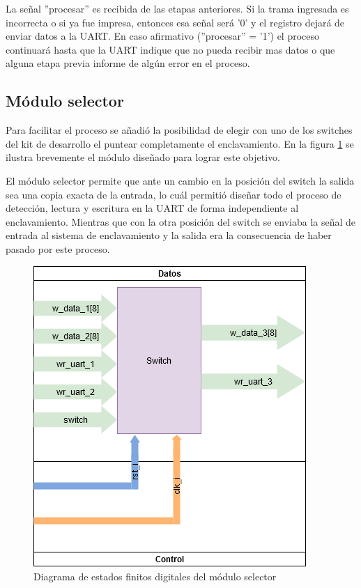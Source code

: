 		La señal ''procesar'' es recibida de las etapas anteriores. Si la trama ingresada es incorrecta o si ya fue impresa, entonces esa señal será '0' y el registro dejará de enviar datos a la UART. En caso afirmativo (''procesar'' = '1') el proceso continuará hasta que la UART indique que no pueda recibir mas datos o que alguna etapa previa informe de algún error en el proceso.
		
	\subsection{Módulo selector}
	
		Para facilitar el proceso se añadió la posibilidad de elegir con uno de los switches del kit de desarrollo el puntear completamente el enclavamiento. En la figura \ref{fig:FSMD_Selector} se ilustra brevemente el módulo diseñado para lograr este objetivo.
		
		El módulo selector permite que ante un cambio en la posición del switch la salida sea una copia exacta de la entrada, lo cuál permitió diseñar todo el proceso de detección, lectura y escritura en la UART de forma independiente al enclavamiento. Mientras que con la otra posición del switch se enviaba la señal de entrada al sistema de enclavamiento y la salida era la consecuencia de haber pasado por este proceso.
		
		\begin{figure}[h]
		\centering
			\includegraphics[scale=.6]{./Figures/FSMD-Selector}
			\caption{Diagrama de estados finitos digitales del módulo selector}
			\label{fig:FSMD_Selector}
		\end{figure}	
		
